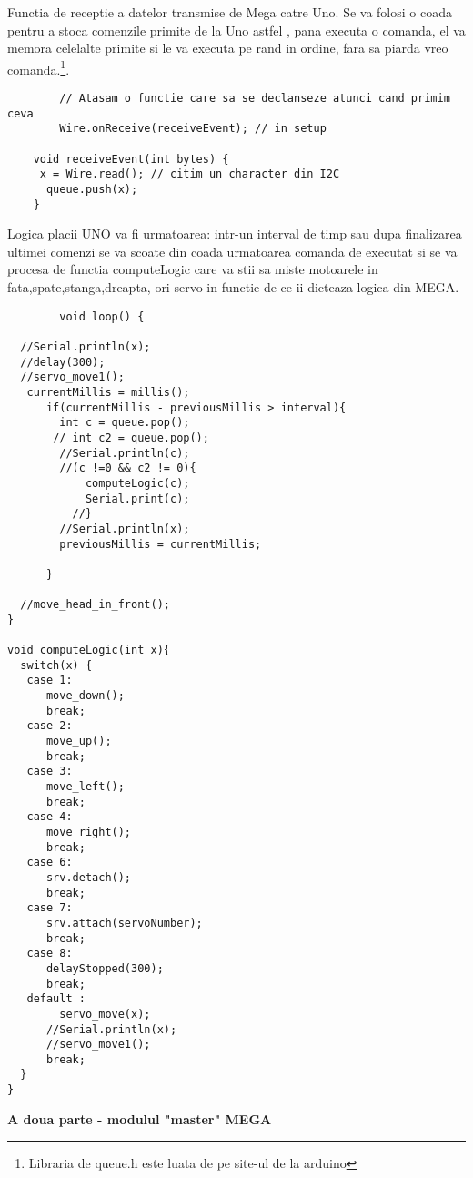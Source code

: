 \begin{itemize}
	\tab Functia de receptie a datelor transmise de Mega catre Uno. Se va folosi o coada pentru a stoca comenzile primite de la Uno astfel , pana executa o comanda, el va memora celelalte primite si le va executa pe rand in ordine, fara sa piarda vreo comanda.\footnote{Libraria de queue.h este luata de pe site-ul de la arduino}.
	\begin{verbatim}
		// Atasam o functie care sa se declanseze atunci cand primim ceva
 		Wire.onReceive(receiveEvent); // in setup

	void receiveEvent(int bytes) {
	 x = Wire.read(); // citim un character din I2C
 	  queue.push(x);
	}
	\end{verbatim}
	\tab Logica placii UNO va fi urmatoarea: intr-un interval de timp sau dupa finalizarea ultimei comenzi se va scoate din coada urmatoarea comanda de executat si se va procesa de functia computeLogic care va stii sa miste motoarele in fata,spate,stanga,dreapta, ori servo in functie de ce ii dicteaza logica din MEGA.\\

	\begin{verbatim}
		void loop() {
 
  //Serial.println(x);
  //delay(300);
  //servo_move1();
   currentMillis = millis();
      if(currentMillis - previousMillis > interval){
        int c = queue.pop();
       // int c2 = queue.pop();
        //Serial.println(c);
        //(c !=0 && c2 != 0){
            computeLogic(c);
            Serial.print(c);
          //}
        //Serial.println(x);
        previousMillis = currentMillis;
         
      }
 
  //move_head_in_front();
}

void computeLogic(int x){
  switch(x) {
   case 1:
      move_down();
      break;
   case 2:
      move_up();
      break;
   case 3:
      move_left();
      break;
   case 4:
      move_right();
      break;
   case 6:
      srv.detach();
      break;
   case 7:
      srv.attach(servoNumber);
      break;
   case 8:
      delayStopped(300);
      break;
   default :
        servo_move(x);
      //Serial.println(x);
      //servo_move1();
      break;
  }
}
	\end{verbatim}
	\tab\tab \bf{A doua parte - modulul "master" MEGA}\\
	
\end{itemize}
	
